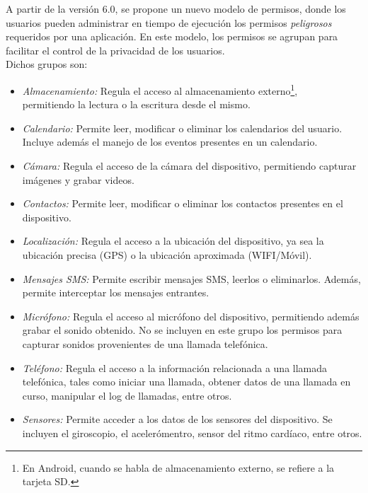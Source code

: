A partir de la versión 6.0, se propone un nuevo modelo de permisos, donde los usuarios pueden administrar en tiempo de ejecución los permisos \emph{peligrosos} requeridos por una aplicación. En este modelo, los permisos se agrupan para facilitar el control de la privacidad de los usuarios.\\

Dichos grupos son:
\begin{itemize}
    \item \emph{Almacenamiento:} Regula el acceso al almacenamiento externo\footnote{En Android, cuando se habla de almacenamiento externo, se refiere a la tarjeta SD.}, \\permitiendo la lectura o la escritura desde el mismo.
    \item \emph{Calendario:} Permite leer, modificar o eliminar los calendarios del usuario. Incluye además el manejo de los eventos presentes en un calendario.
    \item \emph{Cámara:} Regula el acceso de la cámara del dispositivo, permitiendo capturar imágenes y grabar videos.
    \item \emph{Contactos:} Permite leer, modificar o eliminar los contactos presentes en el dispositivo.
    \item \emph{Localización:} Regula el acceso a la ubicación del dispositivo, ya sea la ubicación precisa (GPS) o la ubicación aproximada (WIFI/Móvil).
    \item \emph{Mensajes SMS:} Permite escribir mensajes SMS, leerlos o eliminarlos. Además, permite interceptar los mensajes entrantes.
    \item \emph{Micrófono:} Regula el acceso al micrófono del dispositivo, permitiendo además grabar el sonido obtenido. No se incluyen en este grupo los permisos para capturar sonidos provenientes de una llamada telefónica.
    \item \emph{Teléfono:} Regula el acceso a la información relacionada a una llamada telefónica, tales como iniciar una llamada, obtener datos de una llamada en curso, manipular el log de llamadas, entre otros.
    \item \emph{Sensores:} Permite acceder a los datos de los sensores del dispositivo. Se incluyen el giroscopio, el acelerómentro, sensor del ritmo cardíaco, entre otros.
\end{itemize}
